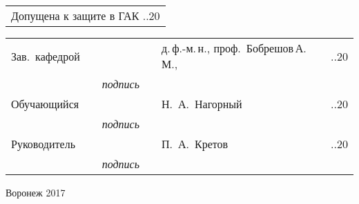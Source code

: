 \begin{titlepage}
\begin{tabularx}{\textwidth}{l}
Допущена к защите в ГАК \hspace{10mm} \underline{\hspace{5mm}}.\underline{\hspace{5mm}}.20\underline{\hspace{5mm}}\\
\end{tabularx}
\hfill \break
\vspace{5mm}
\begin{tabularx}{\textwidth}{llcllll}
Зав.~кафедрой & \hspace{2mm} & \underline{\hspace{15mm}} & \hspace{2mm} & д.\,ф.-м.\,н., проф.~Бобрешов\,А.\,М.,
& \hspace{2mm} & \underline{\hspace{5mm}}.\underline{\hspace{5mm}}.20\underline{\hspace{5mm}} \\
&& {\footnotesize \textit{подпись}} &&&& \\
Обучающийся & \hspace{2mm} & \underline{\hspace{15mm}} & \hspace{2mm} & Н.~А.~Нагорный & \hspace{2mm} & \underline{\hspace{5mm}}.\underline{\hspace{5mm}}.20\underline{\hspace{5mm}} \\
&& {\footnotesize \textit{подпись}} &&&& \\
Руководитель & \hspace{2mm} & \underline{\hspace{15mm}} & \hspace{2mm} & П.~А.~Кретов & \hspace{2mm} & \underline{\hspace{5mm}}.\underline{\hspace{5mm}}.20\underline{\hspace{5mm}} \\
&& {\footnotesize \textit{подпись}} &&&& \\

\end{tabularx}

\vspace*{\fill}

Воронеж 2017
\endgroup
\end{titlepage}

\setcounter{page}{2}
